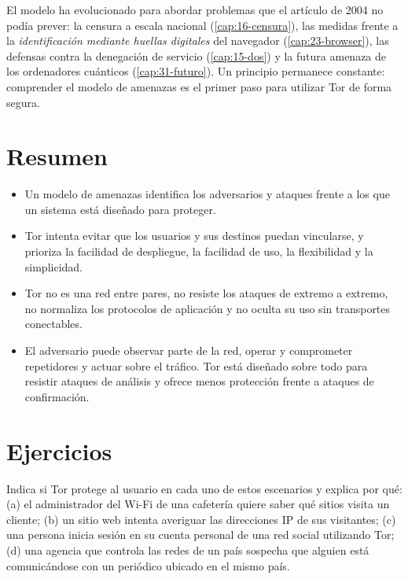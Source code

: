 El modelo ha evolucionado para abordar problemas que el artículo de 2004 no podía prever: la censura a escala nacional (\cref{cap:16-censura}), las medidas frente a la \emph{identificación mediante huellas digitales} del navegador (\cref{cap:23-browser}), las defensas contra la denegación de servicio (\cref{cap:15-dos}) y la futura amenaza de los ordenadores cuánticos (\cref{cap:31-futuro}). Un principio permanece constante: comprender el modelo de amenazas es el primer paso para utilizar Tor de forma segura.

\section*{Resumen}
\begin{itemize}
  \item Un modelo de amenazas identifica los adversarios y ataques frente a los que un sistema está diseñado para proteger.
  \item Tor intenta evitar que los usuarios y sus destinos puedan vincularse, y prioriza la facilidad de despliegue, la facilidad de uso, la flexibilidad y la simplicidad.
  \item Tor no es una red entre pares, no resiste los ataques de extremo a extremo, no normaliza los protocolos de aplicación y no oculta su uso sin transportes conectables.
  \item El adversario puede observar parte de la red, operar y comprometer repetidores y actuar sobre el tráfico. Tor está diseñado sobre todo para resistir ataques de análisis y ofrece menos protección frente a ataques de confirmación.
\end{itemize}

\section*{Ejercicios}

\begin{esercizio}[1]\label{es:04-casi}
Indica si Tor protege al usuario en cada uno de estos escenarios y explica por qué: (a) el administrador del Wi-Fi de una cafetería quiere saber qué sitios visita un cliente; (b) un sitio web intenta averiguar las direcciones IP de sus visitantes; (c) una persona inicia sesión en su cuenta personal de una red social utilizando Tor; (d) una agencia que controla las redes de un país sospecha que alguien está comunicándose con un periódico ubicado en el mismo país.
\end{esercizio}

